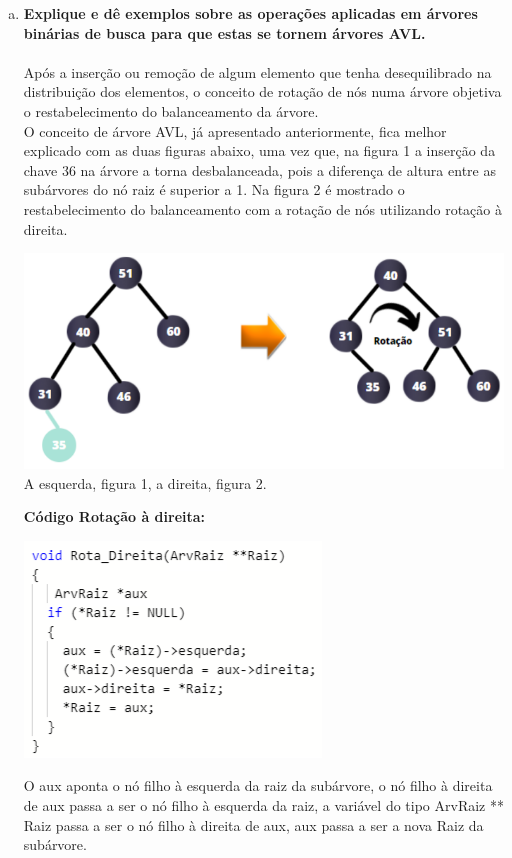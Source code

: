 \documentclass[11pt]{article} %
\begin{document}
\begin{enumerate}[a)]
	\item
{\bf Explique e dê exemplos sobre as operações aplicadas em árvores binárias de busca para que estas se tornem árvores AVL. }\\ \\ 
\hspace*{1cm} Após a inserção ou remoção de algum elemento que tenha desequilibrado na distribuição dos elementos, o conceito de rotação de nós numa árvore objetiva o restabelecimento do balanceamento da árvore. \\
\hspace*{1cm}O  conceito de árvore AVL, já apresentado anteriormente, fica melhor explicado com as duas figuras abaixo, uma vez que, na figura 1 a inserção da chave 36 na árvore a torna desbalanceada, pois a diferença de altura entre as subárvores do nó raiz é superior a 1. Na figura 2 é mostrado o restabelecimento do balanceamento com a rotação de nós utilizando rotação à direita.

		\begin{center}
			\includegraphics[scale = 0.6]{q1a4.png}
			{\small A esquerda, figura 1, a direita, figura 2.}
		\end{center}

	{\bf Código Rotação à direita:} \\
		\begin{center}
			\includegraphics[scale = 0.85]{rotadireita.png}
		\end{center}	
{\small O aux aponta o nó filho à esquerda da raiz da subárvore, o nó filho à direita de aux passa a ser o nó filho à esquerda da raiz, a variável do tipo ArvRaiz ** Raiz passa a ser o nó filho à direita de aux, aux passa a ser a nova Raiz da subárvore.}


\end{enumerate}
\end{document}
